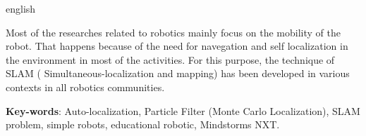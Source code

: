 \begin{resumo}[Abstract]
 \begin{otherlanguage*}{english}

   Most of the researches related to robotics mainly focus on the mobility of the robot. That happens because of the need for navegation
   and self localization in the environment in most of the activities. For this purpose, the technique of SLAM
   ( Simultaneous-localization and mapping) has been developed in various contexts in all robotics communities.
   
   \vspace{\onelineskip}

   \noindent
   \textbf{Key-words}: Auto-localization, Particle Filter (Monte Carlo Localization), SLAM problem, simple robots, educational robotic, Mindstorms NXT.
 \end{otherlanguage*}
\end{resumo}
